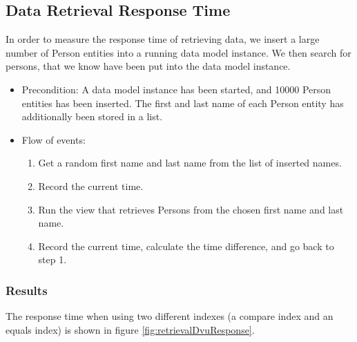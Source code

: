 \subsection{Data Retrieval Response Time}

In order to measure the response time of retrieving data, we insert
a large number of Person entities into a running data model instance.
We then search for persons, that we know have been put into the data
model instance.
\begin{itemize}
\item Precondition: A data model instance has been started, and 10000 Person
entities has been inserted. The first and last name of each Person
entity has additionally been stored in a list.
\item Flow of events:

\begin{enumerate}
\item Get a random first name and last name from the list of inserted names.
\item Record the current time.
\item Run the view that retrieves Persons from the chosen first name and
last name.
\item Record the current time, calculate the time difference, and go back
to step 1.
\end{enumerate}
\end{itemize}

\subsubsection{Results}

The response time when using two different indexes (a compare index
and an equals index) is shown in figure \ref{fig:retrievalDvuResponse}.

